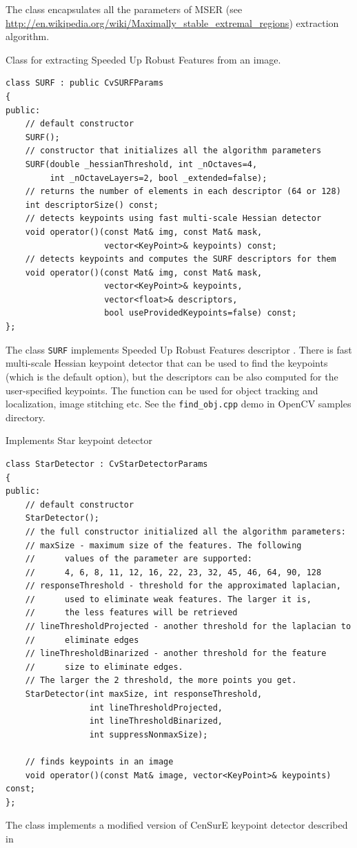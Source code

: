 The class encapsulates all the parameters of MSER (see \url{http://en.wikipedia.org/wiki/Maximally_stable_extremal_regions}) extraction algorithm. 

Class for extracting Speeded Up Robust Features from an image.

\begin{lstlisting}
class SURF : public CvSURFParams
{
public:
    // default constructor
    SURF();
    // constructor that initializes all the algorithm parameters
    SURF(double _hessianThreshold, int _nOctaves=4,
         int _nOctaveLayers=2, bool _extended=false);
    // returns the number of elements in each descriptor (64 or 128)
    int descriptorSize() const;
    // detects keypoints using fast multi-scale Hessian detector
    void operator()(const Mat& img, const Mat& mask,
                    vector<KeyPoint>& keypoints) const;
    // detects keypoints and computes the SURF descriptors for them
    void operator()(const Mat& img, const Mat& mask,
                    vector<KeyPoint>& keypoints,
                    vector<float>& descriptors,
                    bool useProvidedKeypoints=false) const;
};
\end{lstlisting}

The class \texttt{SURF} implements Speeded Up Robust Features descriptor \cite{Bay06}.
There is fast multi-scale Hessian keypoint detector that can be used to find the keypoints
(which is the default option), but the descriptors can be also computed for the user-specified keypoints.
The function can be used for object tracking and localization, image stitching etc. See the
\texttt{find\_obj.cpp} demo in OpenCV samples directory.


Implements Star keypoint detector

\begin{lstlisting}
class StarDetector : CvStarDetectorParams
{
public:
    // default constructor
    StarDetector();
    // the full constructor initialized all the algorithm parameters:
    // maxSize - maximum size of the features. The following 
    //      values of the parameter are supported:
    //      4, 6, 8, 11, 12, 16, 22, 23, 32, 45, 46, 64, 90, 128
    // responseThreshold - threshold for the approximated laplacian,
    //      used to eliminate weak features. The larger it is,
    //      the less features will be retrieved
    // lineThresholdProjected - another threshold for the laplacian to 
    //      eliminate edges
    // lineThresholdBinarized - another threshold for the feature 
    //      size to eliminate edges.
    // The larger the 2 threshold, the more points you get.
    StarDetector(int maxSize, int responseThreshold,
                 int lineThresholdProjected,
                 int lineThresholdBinarized,
                 int suppressNonmaxSize);

    // finds keypoints in an image
    void operator()(const Mat& image, vector<KeyPoint>& keypoints) const;
};
\end{lstlisting}

The class implements a modified version of CenSurE keypoint detector described in
\cite{Agrawal08}

\fi

